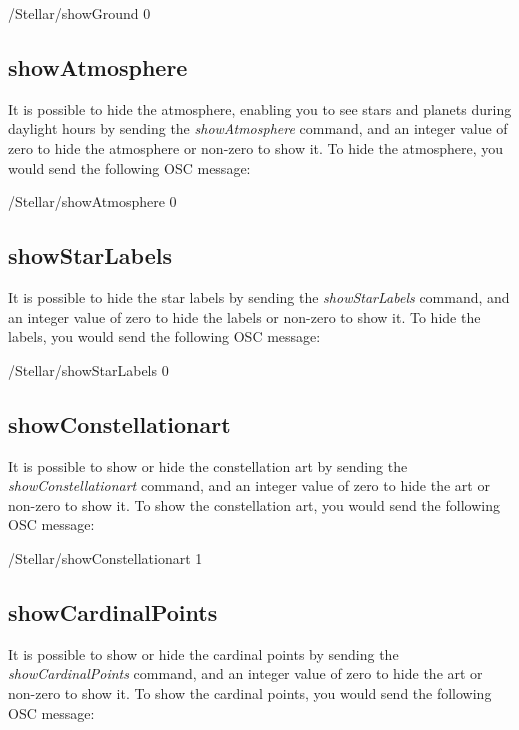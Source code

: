   \begin{syntax}	
 	\medskip
 	/Stellar/showGround 0
 	\medskip
 \end{syntax}

 \subsection{showAtmosphere}
It is possible to hide the atmosphere, enabling you to see stars and planets during daylight hours by sending the \textit{showAtmosphere} command, and an integer value of zero to hide the atmosphere or non-zero to show it. To hide the atmosphere, you would send the following OSC message:

\begin{syntax}	
	\medskip
	/Stellar/showAtmosphere 0
	\medskip
\end{syntax}

 \subsection{showStarLabels}
It is possible to hide the star labels  by sending the \textit{showStarLabels} command, and an integer value of zero to hide the labels or non-zero to show it. To hide the labels, you would send the following OSC message:

\begin{syntax}	
	\medskip
	/Stellar/showStarLabels 0
	\medskip
\end{syntax}

 \subsection{showConstellationart}
It is possible to show or hide the constellation art by sending the \textit{showConstellationart} command, and an integer value of zero to hide the art or non-zero to show it. To show the constellation art, you would send the following OSC message:

\begin{syntax}	
	\medskip
	/Stellar/showConstellationart 1
	\medskip
\end{syntax}

 \subsection{showCardinalPoints}
It is possible to show or hide the cardinal points by sending the \textit{showCardinalPoints} command, and an integer value of zero to hide the art or non-zero to show it. To show the cardinal points, you would send the following OSC message:

